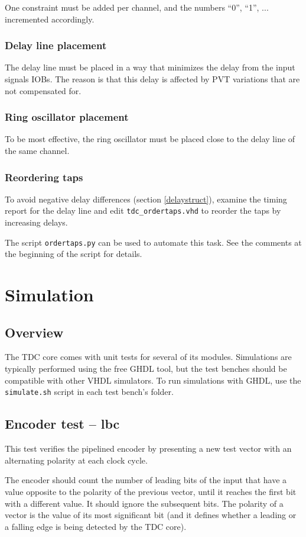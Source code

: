 \documentclass[a4paper,11pt]{article}
\begin{document}
One constraint must be added per channel, and the numbers ``0'', ``1'', ... incremented accordingly.

\subsubsection{Delay line placement}
The delay line must be placed in a way that minimizes the delay from the input signals IOBs. The reason is that this delay is affected by PVT variations that are not compensated for.

\subsubsection{Ring oscillator placement}
To be most effective, the ring oscillator must be placed close to the delay line of the same channel.

\subsubsection{Reordering taps}
To avoid negative delay differences (section \ref{delaystruct}), examine the timing report for the delay line and edit \verb!tdc_ordertaps.vhd! to reorder the taps by increasing delays.

The script \verb!ordertaps.py! can be used to automate this task. See the comments at the beginning of the script for details.

\section{Simulation}
\subsection{Overview}
The TDC core comes with unit tests for several of its modules. Simulations are typically performed using the free GHDL tool, but the test benches should be compatible with other VHDL simulators. To run simulations with GHDL, use the \verb!simulate.sh! script in each test bench's folder.

\subsection{Encoder test -- lbc}
This test verifies the pipelined encoder by presenting a new test vector with an alternating polarity at each clock cycle.

The encoder should count the number of leading bits of the input that have a value opposite to the polarity of the previous vector, until it reaches the first bit with a different value. It should ignore the subsequent bits. The polarity of a vector is the value of its most significant bit (and it defines whether a leading or a falling edge is being detected by the TDC core).
\end{document}
